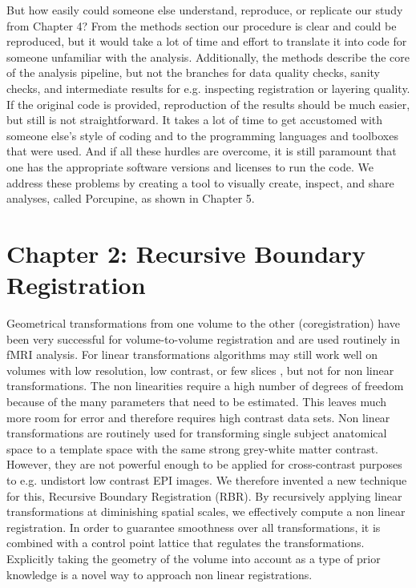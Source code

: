 But how easily could someone else understand, reproduce, or replicate our study from Chapter 4? From the methods section our procedure is clear and could be reproduced, but it would take a lot of time and effort to translate it into code for someone unfamiliar with the analysis. Additionally, the methods describe the core of the analysis pipeline, but not the branches for data quality checks, sanity checks, and intermediate results for e.g. inspecting registration or layering quality. If the original code is provided, reproduction of the results should be much easier, but still is not straightforward. It takes a lot of time to get accustomed with someone else's style of coding and to the programming languages and toolboxes that were used. And if all these hurdles are overcome, it is still paramount that one has the appropriate software versions and licenses to run the code. We address these problems by creating a tool to visually create, inspect, and share analyses, called Porcupine, as shown in Chapter 5.

\section*{Chapter 2: Recursive Boundary Registration}
Geometrical transformations from one volume to the other (coregistration) have been very successful for volume-to-volume registration and are used routinely in fMRI analysis. For linear transformations algorithms may still work well on volumes with low resolution, low contrast, or few slices \cite{Greve201}, but not for non linear transformations. The non linearities require a high number of degrees of freedom because of the many parameters that need to be estimated. This leaves much more room for error and therefore requires high contrast data sets. Non linear transformations are routinely used for transforming single subject anatomical space to a template space with the same strong grey-white matter contrast. However, they are not powerful enough to be applied for cross-contrast purposes to e.g. undistort low contrast EPI images. We therefore invented a new technique for this, Recursive Boundary Registration (RBR). By recursively applying linear transformations at diminishing spatial scales, we effectively compute a non linear registration. In order to guarantee smoothness over all transformations, it is combined with a control point lattice that regulates the transformations. Explicitly taking the geometry of the volume into account as a type of prior knowledge is a novel way to approach non linear registrations.

